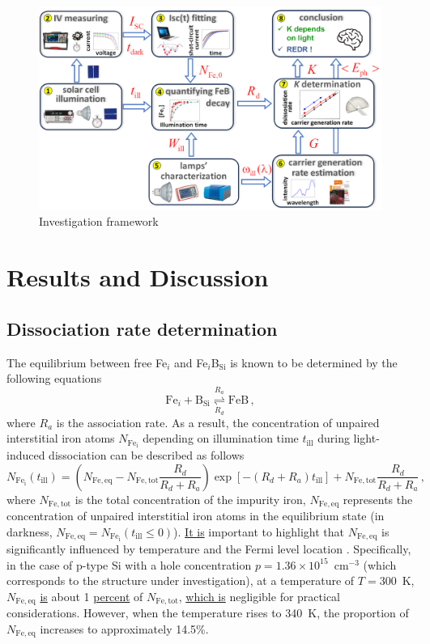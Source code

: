 \documentclass{WileyMSP-template}
\begin{document}
\begin{figure}
\centering
  \includegraphics[width=0.7\linewidth]{Fig1.png}
  \caption{Investigation framework}
  \label{fig1}
\end{figure}


\section{Results and Discussion}

\subsection{Dissociation rate determination}\label{SecR}

The equilibrium between free Fe$_i$ and Fe$_i$B$_\mathrm{Si}$ is known to be determined by the following equations \cite{FeB:kinetic,Sun2021,FeBAssJAP2014}
\begin{equation}
\label{eqReac}
\mathrm{Fe}_i+\mathrm{B}_\mathrm{Si}  \overset{R_a}{\underset{R_d}{\rightleftharpoons{}}} \mathrm{FeB}\,,
\end{equation}
where
$R_a$ is the association rate.
As a result, the concentration of unpaired interstitial iron atoms $N_\mathrm{Fe_i}$ depending on illumination time $t_\mathrm{ill}$
during light-induced dissociation can be described as follows \cite{FeBLight2,FeBKin2019,Olikh2021JAP}
\begin{equation}
\label{eqNfeill}
N_\mathrm{Fe_i}(t_\mathrm{ill})=\left(N_\mathrm{Fe,eq}-N_\mathrm{Fe,tot}
\frac{R_d}{R_d+R_a}\right)\exp[-(R_d+R_a)t_\mathrm{ill}]+N_\mathrm{Fe,tot}\frac{R_d}{R_d+R_a}\,,
\end{equation}
where
$N_\mathrm{Fe,tot}$ is the total concentration of the impurity iron,
$N_\mathrm{Fe,eq}$ represents the concentration of unpaired interstitial iron atoms in the equilibrium state
(in darkness, $N_\mathrm{Fe,eq}=N_\mathrm{Fe_i}(t_\mathrm{ill}\leq0)$).
\textcolor[rgb]{0.00,0.07,1.00}{\uline{It is}} important to highlight that $N_\mathrm{Fe,eq}$ is significantly influenced
by temperature and the Fermi level location \cite{FeB:kinetic}.
Specifically, in the case of p-type Si with a hole concentration $p=1.36\times10^{15}$~cm$^{-3}$
(which corresponds to the structure under investigation),
at a temperature of $T=300$~K, $N_\mathrm{Fe,eq}$ \textcolor[rgb]{0.00,0.07,1.00}{\uline{is}} about 1 \textcolor[rgb]{0.00,0.07,1.00}{\uline{percent}} of $N_\mathrm{Fe,tot}$,
\textcolor[rgb]{0.00,0.07,1.00}{\uline{which is}} negligible for practical considerations.
However, when the temperature rises to 340~K, the proportion of $N_\mathrm{Fe,eq}$ increases to approximately 14.5\%.
\end{document}
